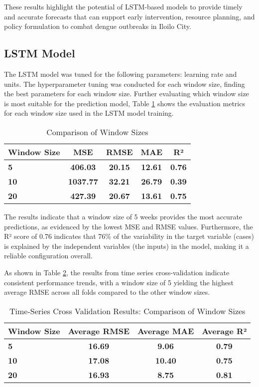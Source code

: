 These results highlight the potential of LSTM-based models to provide timely and accurate forecasts that can support early intervention, resource planning, and policy formulation to combat dengue outbreaks in Iloilo City.

\subsection{LSTM Model}
The LSTM model was tuned for the following parameters: learning rate and units. The hyperparameter tuning was conducted for each window size, finding the best parameters for each window size. Further evaluating which window size is most suitable for the prediction model, Table \ref{tab:comparison_of_lstm} shows the evaluation metrics for each window size used in the LSTM model training.
\begin{table}[h!]
	\centering
	\begin{tabular}{|l|c|c|c|c|}
		\hline
		\textbf{Window Size} & \textbf{MSE} & \textbf{RMSE} & \textbf{MAE} & \textbf{R²}\\ \hline
		\textbf{5} & \textbf{406.03} & \textbf{20.15} & \textbf{12.61} & \textbf{0.76}\\ \hline
		\textbf{10} & \textbf{1037.77} & \textbf{32.21} & \textbf{26.79} & \textbf{0.39}\\ \hline
		\textbf{20} & \textbf{427.39} & \textbf{20.67} & \textbf{13.61} & \textbf{0.75}\\ \hline
	\end{tabular}
	\caption{Comparison of Window Sizes}
	\label{tab:comparison_of_lstm}
\end{table}

The results indicate that a window size of 5 weeks provides the most accurate predictions, as evidenced by the lowest MSE and RMSE values. Furthermore, the R² score of 0.76 indicates that 76\% of the variability in the target variable (cases) is explained by the independent variables (the inputs) in the model, making it a reliable configuration overall.

As shown in Table \ref{tab:tcsv_lstm_table}, the results from time series cross-validation indicate consistent performance trends, with a window size of 5 yielding the highest average RMSE across all folds compared to the other window sizes.

\begin{table}[h!]
	\centering
	\begin{tabular}{|l|c|c|c|}
		\hline
		\textbf{Window Size} & \textbf{Average RMSE} & \textbf{Average MAE} & \textbf{Average R²}\\ \hline
		\textbf{5} & \textbf{16.69} & \textbf{9.06} & \textbf{0.79}\\ \hline
		\textbf{10} & \textbf{17.08} & \textbf{10.40} & \textbf{0.75}\\ \hline
		\textbf{20}& \textbf{16.93} & \textbf{8.75} & \textbf{0.81}\\ \hline
	\end{tabular}
	\caption{Time-Series Cross Validation Results: Comparison of Window Sizes}
	\label{tab:tcsv_lstm_table}
\end{table}

